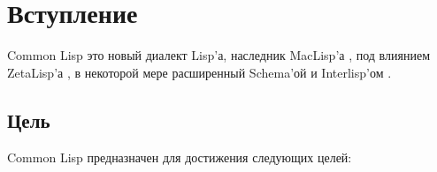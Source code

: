 \else

\chapter{Вступление}

Common Lisp это новый диалект Lisp'а, наследник
MacLisp'а \cite{MOONUAL,PITMANUAL}, под влиянием
ZetaLisp'а \cite{BLUE-LISPM,GREEN-LISPM}, в некоторой мере расширенный Schema'ой
\cite{SCHEME-REVISED-REPORT} и Interlisp'ом \cite{INTERLISP}. 

\section{Цель}

Common Lisp предназначен для достижения следующих целей: 

